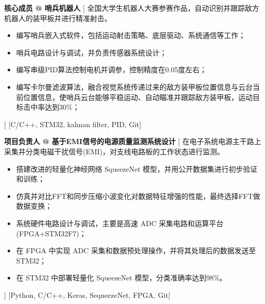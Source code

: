 \begin{experiences}
    {\textbf{核心成员 @ 哨兵机器人}}%
    [
    全国大学生机器人大赛参赛作品，自动识别并跟踪敌方机器人的装甲板并进行精准射击。
        \begin{itemize}
            \item {编写哨兵嵌入式软件，包括运动射击策略、底层驱动、系统通信等工作；}
            \item {哨兵电路设计与调试，并负责传感器系统设计；}
            \item {编写串级PID算法控制电机并调参，控制精度在0.05度左右；}
            \item {编写卡尔曼滤波算法，融合视觉系统传递过来的敌方装甲板位置信息与云台当前位置信息，使哨兵云台能够平稳运动、自动瞄准并跟踪敌方装甲板，运动目标击中率达到30\%；}
        \end{itemize}
    ]
    [C/C++, STM32, kalman filter, PID, Git]
    \separator{0.5ex}

    {\textbf{项目负责人 @ 基于EMI信号的电源质量监测系统设计 }}%
    [
    在电子系统电源主干路上采集并分类电磁干扰信号(EMI)，对支线电路板的工作状态进行监测。
        \begin{itemize}
            \item {搭建改进的轻量化神经网络 SqueezeNet 模型，并用公开数据集进行初步验证和训练；}
            \item {仿真并对比FFT和同步压缩小波变化对数据特征增强的性能，最终选择FFT做数据变换；}
            \item {系统硬件电路设计与调试，主要是高速 ADC 采集电路和运算平台(FPGA+STM32F7)；}
            \item {在 FPGA 中实现 ADC 采集和数据预处理操作，并将其处理后的数据发送至STM32；}
            \item {在 STM32 中部署轻量化 SqueezeNet 模型，分类准确率达到98\%。}
        \end{itemize}]
    [Python, C/C++, Keras, SequeezeNet, FPGA, Git]
    
    
    
\end{experiences}